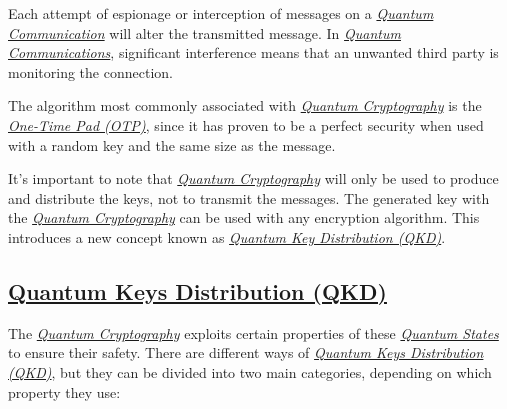 \documentclass[conference]{IEEEtran}
\begin{document}
\vspace{4pt}

Each attempt of espionage or interception of messages on a \href{https://en.wikipedia.org/wiki/Quantum_information_science}{\textit{Quantum Communication}} will alter the transmitted message. In \href{https://en.wikipedia.org/wiki/Quantum_information_science}{\textit{Quantum Communications}}, significant interference means that an unwanted third party is monitoring the connection.

\vspace{4pt}

The algorithm most commonly associated with \href{https://en.wikipedia.org/wiki/Quantum_cryptography}{\textit{Quantum Cryptography}} is the \href{https://en.wikipedia.org/wiki/One-time_pad}{\textit{One-Time Pad (OTP)}}, since it has proven to be a perfect security when used with a random key and the same size as the message.

\vspace{4pt}

It's important to note that \href{https://en.wikipedia.org/wiki/Quantum_cryptography}{\textit{Quantum Cryptography}} will only be used to produce and distribute the keys, not to transmit the messages. The generated key with the \href{https://en.wikipedia.org/wiki/Quantum_cryptography}{\textit{Quantum Cryptography}} can be used with any encryption algorithm. This introduces a new concept known as \href{https://en.wikipedia.org/wiki/Quantum_key_distribution}{\textit{Quantum Key Distribution (QKD)}}.

\vspace{6pt}

\subsection{\href{https://en.wikipedia.org/wiki/Quantum_key_distribution}{Quantum Keys Distribution (QKD)}}\label{A4}

\vspace{4pt}

The \href{https://en.wikipedia.org/wiki/Quantum_cryptography}{\textit{Quantum Cryptography}} exploits certain properties of these \href{https://en.wikipedia.org/wiki/Quantum_state}{\textit{Quantum States}} to ensure their safety. There are different ways of \href{https://en.wikipedia.org/wiki/Quantum_key_distribution}{\textit{Quantum Keys Distribution (QKD)}}, but they can be divided into two main categories, depending on which property they use:
\end{document}
